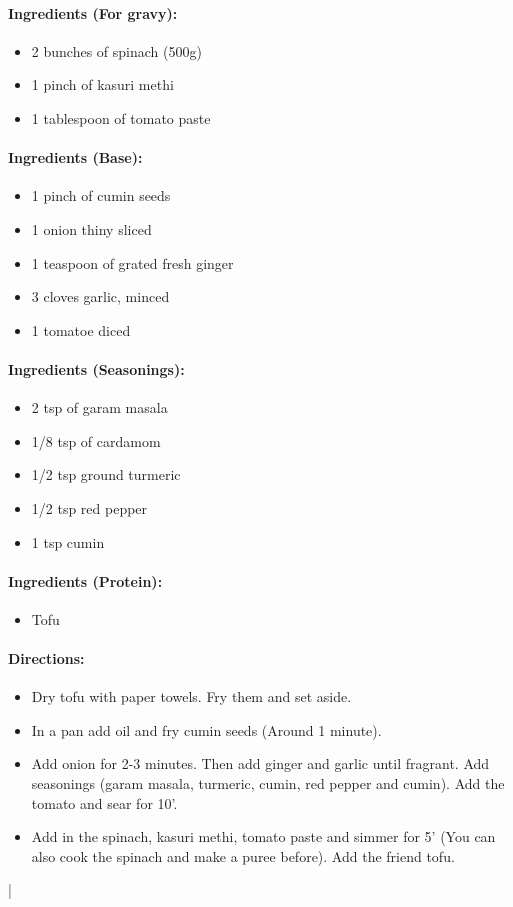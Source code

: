 \documentclass{article}
\begin{document}
\paragraph{Ingredients (For gravy):}
\begin{itemize}
	\item 2 bunches of spinach (500g)
	\item 1 pinch of kasuri methi
	\item 1 tablespoon of tomato paste
\end{itemize}

\paragraph{Ingredients (Base):}
\begin{itemize}
	\item 1 pinch of cumin seeds
	\item 1 onion thiny sliced
	\item 1 teaspoon of grated fresh ginger
	\item 3 cloves garlic, minced
	\item 1 tomatoe diced
\end{itemize}

\paragraph{Ingredients (Seasonings):}
\begin{itemize}
	\item 2 tsp of garam masala
	\item 1/8 tsp of cardamom
	\item 1/2 tsp ground turmeric
	\item 1/2 tsp red pepper
	\item 1 tsp cumin
\end{itemize}

\paragraph{Ingredients (Protein):}
\begin{itemize}
	\item Tofu
\end{itemize}

\paragraph{Directions:}
\begin{itemize}
	\item Dry tofu with paper towels. Fry them and set aside.
	\item In a pan add oil and fry cumin seeds (Around 1 minute). \item Add onion for 2-3 minutes. Then add ginger and garlic until fragrant. Add seasonings (garam masala, turmeric, cumin, red pepper and cumin). Add the tomato and sear for 10'.
	
	\item Add in the spinach, kasuri methi, tomato paste and simmer for 5' (You can also cook the spinach and make a puree before). Add the friend tofu. 
\end{itemize}|
\end{document}
